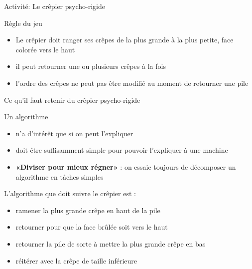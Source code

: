 \documentclass[final,hyperref={pdfpagelabels=false}]{beamer}
\renewenvironment{Coupe}{   }{   }
\begin{document}
\begin{Coupe}
\begin{frame}{Activité: Le crêpier psycho-rigide}
  \begin{block}{Règle du jeu}
    \begin{itemize}
    \item Le crêpier doit ranger ses crêpes de la plus grande à la plus petite,
      face colorée vers le haut
    \item il peut retourner une ou plusieurs crêpes à la fois
    \item l'ordre des crêpes ne peut pas être modifié au moment de retourner
      une pile
    \end{itemize}
  \end{block}

\end{frame}
\begin{frame}{Ce qu'il faut retenir du  crêpier psycho-rigide}

  \begin{block}{Un algorithme}
    \begin{itemize}
    \item n'a d'intérêt que si on peut l'expliquer
    \item doit être suffisamment simple pour pouvoir l'expliquer à une machine
    \item \alert{\textbf{«Diviser pour mieux régner»}} : on essaie
    toujours de décomposer un algorithme en tâches simples
    \end{itemize}
  \end{block}

  \begin{block}{L'algorithme que doit suivre le crêpier est :}
    \begin{itemize}
    \item ramener la plus grande crêpe en haut de la pile
    \item retourner pour que la face brûlée soit vers le haut
    \item retourner la pile de sorte à mettre la plus grande crêpe en bas
    \item réitérer avec la crêpe de taille inférieure
    \end{itemize}
  \end{block}


\end{frame}
\end{Coupe}
\end{document}
